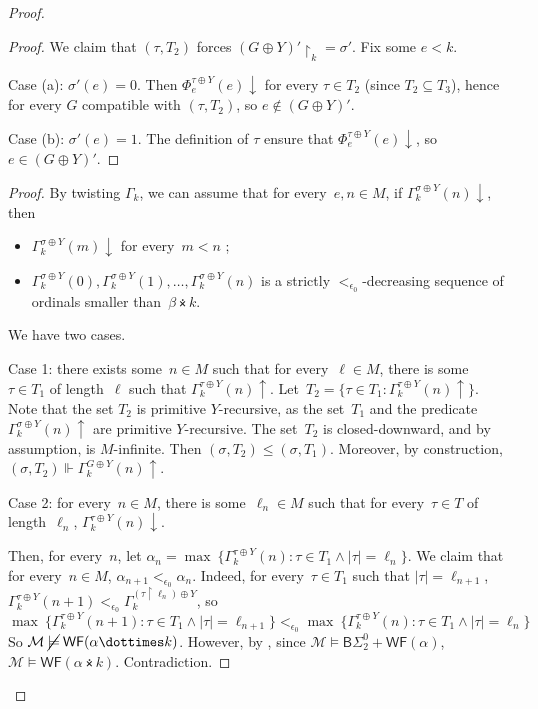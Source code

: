\documentclass{article}
\numberwithin{theorem}{section}
\newtheorem{lemma}[theorem]{Lemma}
\newcommand{\BSig}{\mathsf{B}\Sigma^0}
\newcommand{\WF}{\mathsf{WF}}
\newcommand{\M}{\mathcal{M}}
\newcommand{\uh}[0]{{\upharpoonright}}
\newcommand{\ntimes}{\dottimes}
\begin{document}
\begin{proof}
\begin{proof}
We claim that $(\tau, T_2)$ forces $(G \oplus Y)' \uh_k = \sigma'$. Fix some $e < k$.

Case (a): $\sigma'(e) = 0$. Then $\Phi_e^{\tau \oplus Y}(e) \downarrow$ for every $\tau \in T_2$ (since $T_2 \subseteq T_3$), hence for every $G$ compatible with $(\tau,T_2)$, so $e \notin (G \oplus Y)'$.

Case (b): $\sigma'(e) = 1$. The definition of $\tau$ ensure that $\Phi_e^{\tau \oplus Y}(e) \downarrow$, so $e \in (G \oplus Y)'$. 
\end{proof}



\begin{proof}
By twisting $\Gamma_k$, we can assume that for every~$e, n \in M$, if $\Gamma^{\sigma \oplus Y}_k(n)\downarrow$, then
\begin{itemize}
    \item $\Gamma^{\sigma \oplus Y}_k(m)\downarrow$ for every~$m < n$ ;
    \item $\Gamma^{\sigma \oplus Y}_k(0), \Gamma^{\sigma \oplus Y}_k(1), \dots, \Gamma^{\sigma \oplus Y}_k(n)$ is a strictly $<_{\epsilon_0}$-decreasing sequence of ordinals smaller than~$\beta \ntimes k$.
\end{itemize}
We have two cases.

Case 1: there exists some~$n \in M$ such that for every~$\ell \in M$, there is some~$\tau \in T_1$ of length~$\ell$ such that $\Gamma^{\tau \oplus Y}_k(n)\uparrow$. Let~$T_2 = \{ \tau \in T_1 : \Gamma^{\tau \oplus Y}_k(n)\uparrow \}$. Note that the set $T_2$ is primitive $Y$-recursive, as the set~$T_1$ and the predicate $\Gamma^{\sigma \oplus Y}_k(n)\uparrow$ are primitive $Y$-recursive. The set~$T_2$ is closed-downward, and by assumption, is $M$-infinite. Then $(\sigma, T_2) \leq (\sigma, T_1)$. Moreover, by construction, $(\sigma, T_2) \Vdash \Gamma_k^{G \oplus Y}(n)\uparrow$.


Case 2: for every~$n \in M$, there is some~$\ell_n \in M$ such that 
for every~$\tau \in T$ of length~$\ell_n$, $\Gamma^{\tau \oplus Y}_k(n)\downarrow$.

Then, for every~$n$, let $\alpha_n = \max\ \{ \Gamma^{\tau \oplus Y}_k(n) : \tau \in T_1 \wedge |\tau| = \ell_n \}$.
We claim that for every~$n \in M$, $\alpha_{n+1} <_{\epsilon_0} \alpha_n$.
Indeed, for every~$\tau \in T_1$ such that $|\tau| = \ell_{n+1}$, $\Gamma^{\tau \oplus Y}_k(n+1) <_{\epsilon_0} \Gamma^{(\tau \uh \ell_n) \oplus Y}_k$, so
$$
\max\ \{ \Gamma^{\tau \oplus Y}_k(n+1) : \tau \in T_1 \wedge |\tau| = \ell_{n+1} \}
<_{\epsilon_0} \max\ \{ \Gamma^{\tau \oplus Y}_k(n) : \tau \in T_1 \wedge |\tau| = \ell_n \}
$$
So $\M \mathbin{\cancel{\models}} \WF(\alpha \ntimes k)$. However, by , since $\M \models \BSig_2 + \WF(\alpha)$, $\M \models \WF(\alpha \ntimes k)$. Contradiction.
\end{proof}


\end{proof}
\end{document}
